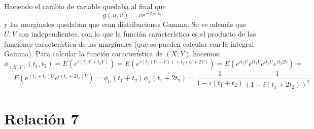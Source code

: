 \documentclass[openany]{book}
\begin{document}
\begin{exercise}
    Haciendo el cambio de variable quedaba al final que $$ g(u,v) = v e^{-v-u} $$ y las marginales quedaban que eran distribuciones Gamma. Se ve además que $ U,V $ son independientes, con lo que la función característica es el producto de las funciones característica de las marginales (que se pueden calcular con la integral Gamma). Para calcular la función característica de $ (X,Y) $ hacemos:
    $$ \phi_{(X,Y)}(t_1,t_2) = E(e^{i(t_1X+t_2Y)}) = E(e^{i(t_1(U+V))+t_2(U+2V)}) = E(e^{it_1U}e^{it_1V}e^{it_2U}e^{it_2 2V}) = $$ 
     $$=E(e^{(t_1+t_2)U}e^{i(t_1+2t_2)V})= \phi_{U}(t_1+t_2) \phi_{V}(t_1+2t_2) = \dfrac{1}{1-i(t_1+t_2)} \dfrac{1}{(1-i(t_1+2t_2))^2} $$ 

\end{exercise}



\chapter{Relación 7}
\end{document}

